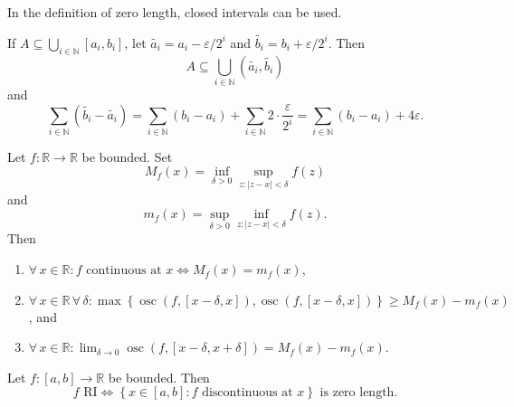 \documentclass{notes}
\begin{document}
  \begin{lem}
    In the definition of zero length, closed intervals can be used.
  \end{lem}
  
  \begin{prf}
    If $A \subseteq \bigcup_{i \in \mathbb N} [a_i, b_i]$, let $\tilde{a_i} = a_i - \varepsilon / 2^i$ and $\tilde{b_i} = b_i + \varepsilon / 2^i$.
    Then 
    \[
      A \subseteq \bigcup_{i \in \mathbb N} (\tilde{a_i}, \tilde{b_i})
    \]
    and 
    \[
      \sum_{i \in \mathbb N} (\tilde{b_i} - \tilde{a_i}) = \sum_{i \in \mathbb N} (b_i - a_i) + \sum_{i \in \mathbb N} 2 \cdot \frac{\varepsilon}{2^i} = \sum_{i \in \mathbb N} (b_i - a_i) + 4 \varepsilon.
    \]
  \end{prf}
  
  \begin{lem}
    Let $f \colon \mathbb R \to \mathbb R$ be bounded.
    Set 
    \[ 
      M_f(x) = \inf_{\delta > 0} \sup_{z : \left | z - x \right | < \delta} f(z)
    \]
    and 
    \[
      m_f(x) = \sup_{\delta > 0} \inf_{z : \left | z - x \right | < \delta} f(z).
    \]
    Then 
    \begin{enumerate}
      \item $\forall \, x \in \mathbb R: \text{$f$ continuous at $x$} \Leftrightarrow M_f(x) = m_f(x)$, 
        
      \item $\forall \, x \in \mathbb R \, \forall \, \delta: \max \left \{ \operatorname{osc}(f, [x - \delta, x]), \operatorname{osc}(f, [x - \delta, x]) \right \} \geq M_f(x) - m_f(x)$, and 
        
      \item $\forall \, x \in \mathbb R: \lim_{\delta \to 0} \operatorname{osc}(f, [x - \delta, x + \delta]) = M_f(x) - m_f(x)$.
    \end{enumerate}
  \end{lem}
  
  \begin{thm}
    Let $f \colon [a, b] \to \mathbb R$ be bounded.
    Then 
    \[
      f \text{ RI} \Leftrightarrow \left \{ x \in [a, b] : \text{$f$ discontinuous at $x$} \right \} \text{ is zero length}.
    \]
  \end{thm}
  
\end{document}
